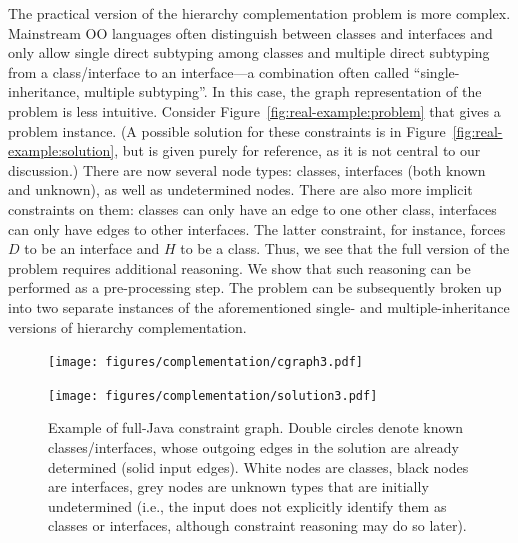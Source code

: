 The practical version of the hierarchy complementation problem is more
complex. Mainstream OO languages often distinguish between classes and
interfaces and only allow single direct subtyping among classes and
multiple direct subtyping from a class/interface to an interface---a
combination often called ``single-inheritance, multiple
subtyping''. In this case, the graph representation of the problem is
less intuitive. Consider Figure~\ref{fig:real-example:problem} that
gives a problem instance. (A possible solution for these constraints
is in Figure~\ref{fig:real-example:solution}, but is given purely for
reference, as it is not central to our discussion.) There are now
several node types: classes, interfaces (both known and unknown), as
well as undetermined nodes. There are also more implicit constraints
on them: classes can only have an edge to one other class, interfaces
can only have edges to other interfaces.  The latter constraint, for
instance, forces $D$ to be an interface and $H$ to be a class. Thus, we
see that the full version of the problem requires additional
reasoning. We show that such reasoning can be performed as a
pre-processing step. The problem can be subsequently broken up into
two separate instances of the aforementioned single- and
multiple-inheritance versions of hierarchy complementation.


\begin{figure}[t]
  \begin{minipage}[b]{.5\linewidth}
    \centering
    \texttt{[image: figures/complementation/cgraph3.pdf]}
    \label{fig:real-example:problem}
  \end{minipage}
  \begin{minipage}[b]{.5\linewidth}
    \centering
    \texttt{[image: figures/complementation/solution3.pdf]}
    \label{fig:real-example:solution}
  \end{minipage}
  \caption[Example of full-Java constraint graph]{Example of full-Java
    constraint graph. Double circles denote known classes/interfaces,
    whose outgoing edges in the solution are already determined (solid
    input edges). White nodes are classes, black nodes are interfaces,
    grey nodes are unknown types that are initially undetermined
    (i.e., the input does not explicitly identify them as classes or
    interfaces, although constraint reasoning may do so later).}
  \label{fig:real-example}
\end{figure}



